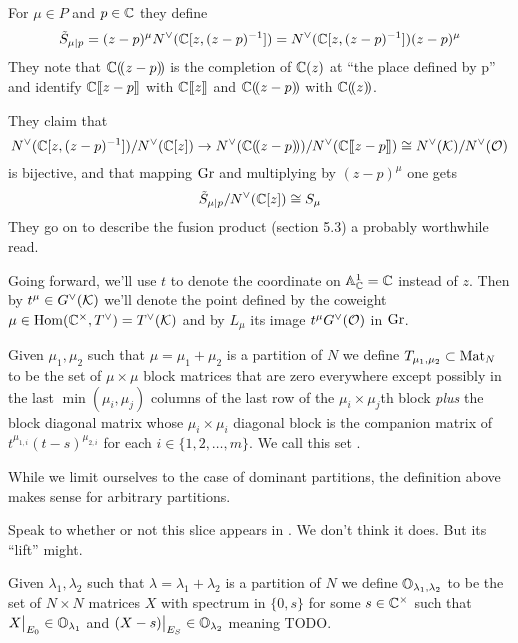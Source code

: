\documentclass{article}
\newcommand{\anne}[2]{\colorbox{pink!75!blue}{#1}\marginpar[]{\tiny\textbf{\color{pink!50!blue}#2}}}
\begin{document}
For $\mu\in P$ and $p\in\CC$ they define 
\[
    \tilde S_{\mu | p} = (z-p)^\mu N^\vee (\CC[z,(z-p)^{-1}]) = N^\vee (\CC[z,(z-p)^{-1}])(z-p)^\mu
\]
They note that $\CC\xT[z-p]$ is the completion of $\CC(z)$ at ``the place defined by p'' and identify $\CC\xt[z-p]$ with $\CC\xt[z]$ and $\CC\xT[z-p]$ with $\CC\xT[z]$. 

They claim that 
\[
    N^\vee (\CC[z,(z-p)^{-1}])/N^\vee (\CC[z]) \to N^\vee(\CC\xT[z-p])/N^\vee(\CC\xt[z-p]) \cong N^\vee(\cK)/N^\vee(\cO)
\]
is bijective, and that mapping $\Gr$ and multiplying by $(z-p)^\mu$ one gets 
\[
\tilde S_{\mu | p}/N^\vee(\CC[z])\cong S_\mu
\]
They go on to describe the fusion product (section 5.3) a probably worthwhile read. 

Going forward, we'll use $t$ to denote the coordinate on $\AA^1_\CC = \CC$ instead of $z$. Then by $t^\mu \in \Gch(\cK)$ we'll denote the point defined by the coweight $\mu \in \Hom(\CC^\times,T^\vee) = T^\vee(\cK)$ and by $L_\mu$ its image $t^\mu \Gch(\cO)$ in $\Gr$.

\begin{definition}
    Given $\mu_1,\mu_2$ such that $\mu = \mu_1 +\mu_2$ is a partition of $N$ we define $T_{\mu_1,\mu_2}\subset \mat_N$ to be the set of $\mu\times\mu$ block matrices that are zero everywhere except possibly in the last $\min(\mu_i,\mu_j)$ columns of the last row of the $\mu_i\times\mu_j$th block \textit{plus} the block diagonal matrix whose $\mu_i\times\mu_i$ diagonal block is the companion matrix of $t^{\mu_{1,i}}(t-s)^{\mu_{2,i}}$ for each $i\in\{1,2,\dots,m\}$. We call this set .
\end{definition}

\begin{remark}
    While we limit ourselves to the case of dominant partitions, the definition above makes sense for arbitrary partitions.
\end{remark}
\begin{remark}
    Speak to whether or not this slice appears in \cite{mirkovic2007quiver}. We don't think it does. But its ``lift'' might. 
\end{remark}

\begin{definition}
    Given $\lambda_1,\lambda_2$ such that $\lambda = \lambda_1 + \lambda_2$ is a partition of $N$ we define $\OO_{\lambda_1,\lambda_2}$ to be the set of $N\times N$ \anne{}{Cute?} matrices $X$ with spectrum in $\{0,s\}$ for some $s\in\CC^\times$ such that 
    $X\big|_{E_0} \in \OO_{\lambda_1}$ and $(X-s)\big|_{E_S}\in\OO_{\lambda_2}$ meaning TODO. 
\end{definition}
\end{document}
